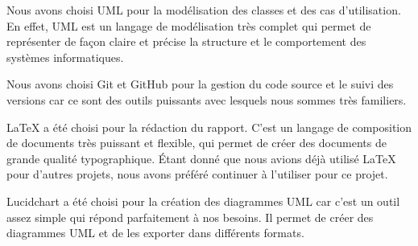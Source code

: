 Nous avons choisi UML pour la modélisation des classes et des cas d'utilisation. En effet, UML
est un langage de modélisation très complet qui permet de représenter de
façon claire et précise la structure et le comportement des systèmes informatiques.

Nous avons choisi Git et GitHub pour la gestion du code source et le suivi des
versions car ce sont des outils puissants avec lesquels nous sommes très
familiers.

LaTeX a été choisi pour la rédaction du rapport. C'est un langage de
composition de documents très puissant et flexible, qui permet de créer des
documents de grande qualité typographique.
Étant donné que nous avions déjà utilisé LaTeX pour d'autres projets, nous avons
préféré continuer à l'utiliser pour ce projet.

Lucidchart a été choisi pour la création des diagrammes UML car c'est un outil assez
simple qui répond parfaitement à nos besoins. Il permet de créer des diagrammes
UML et de les exporter dans différents formats.

